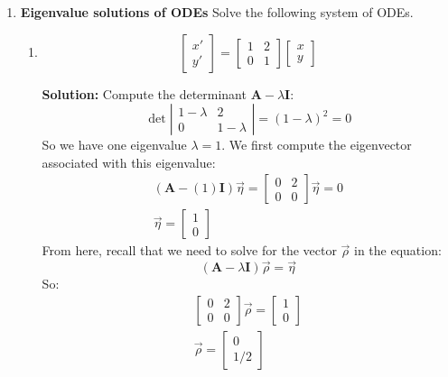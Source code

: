 \documentclass[letterpaper, fontsize=10pt]{scrartcl} %
\numberwithin{equation}{section} %
\numberwithin{figure}{section} %
\numberwithin{table}{section} %
\begin{document}
\begin{enumerate}

\item \textbf{Eigenvalue solutions of ODEs}
Solve the following system of ODEs.
\begin{enumerate}[label=(\alph*)]
\item 
\[ \begin{bmatrix} x' \\ y'  \end{bmatrix} = \begin{bmatrix} 1 & 2 \\ 0 & 1 \end{bmatrix} \begin{bmatrix} x \\ y \end{bmatrix} \]
\par \textbf{Solution:} Compute the determinant $\bm{A} - \lambda \bm{I}$:
\[ \det\left|   \begin{matrix} 1 - \lambda & 2 \\ 0 & 1 - \lambda \end{matrix} \right| = (1 - \lambda)^2 = 0  \]
So we have one eigenvalue $\lambda = 1$. We first compute the eigenvector associated with this eigenvalue:
\begin{gather*}
(\bm{A} - (1)\bm{I})\vec{\eta} = \begin{bmatrix} 0 & 2 \\ 0 & 0 \end{bmatrix} \vec{\eta} = 0 \\
\vec{\eta} = \begin{bmatrix} 1 \\ 0 \end{bmatrix} 
\end{gather*}
From here, recall that we need to solve for the vector $\vec{\rho}$ in the equation:
\[ (\bm{A} - \lambda \bm{I})\vec{\rho} = \vec{\eta} \]
So:
\begin{gather*}
\begin{bmatrix} 0 & 2 \\ 0 & 0 \end{bmatrix} \vec{\rho} = \begin{bmatrix} 1 \\ 0 \end{bmatrix}  \\
\vec{\rho} = \begin{bmatrix} 0 \\ 1/2 \end{bmatrix}
\end{gather*}

\end{enumerate}
\end{enumerate}
\end{document}
